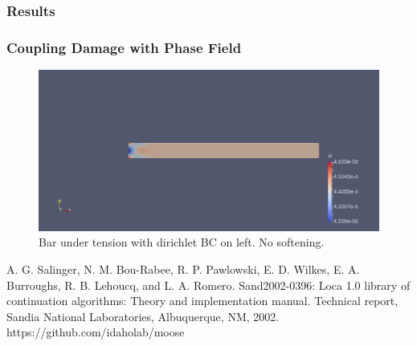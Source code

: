 \documentclass[11pt]{beamer}
\begin{document}
	\begin{frame}
		\frametitle{Results}
		\begin{figure}[!h]
		
		
			
		\end{figure}
	\end{frame}

	\begin{frame}
		\frametitle{Coupling Damage with Phase Field}
		
\begin{figure}
\centering
\includegraphics[width=0.7\linewidth]{tension_basic}
\caption{Bar under tension with dirichlet BC on left. No softening.}
\label{fig:tension_basic}
\end{figure}
	\end{frame}
	
	
	
	
	
	
	
	
	
	\begin{frame}
			\begin{thebibliography}{9}
				\bibitem{arclength} 
				A. G. Salinger, N. M. Bou-Rabee, R. P. Pawlowski, E. D. Wilkes, E. A.
				Burroughs, R. B. Lehoucq, and L. A. Romero. Sand2002-0396: Loca 1.0
				library of continuation algorithms: Theory and implementation manual.
				Technical report, Sandia National Laboratories, Albuquerque, NM, 2002.
				https://github.com/idaholab/moose
			\end{thebibliography}
	\end{frame}
\end{document}
